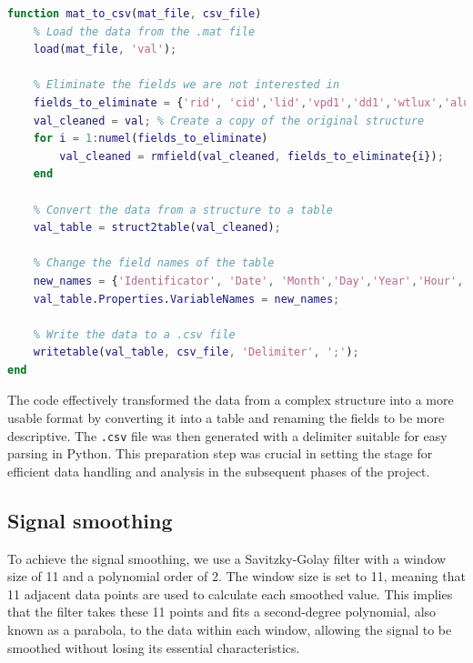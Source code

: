 \begin{lstlisting}[language=Matlab,caption={MATLAB function to convert .mat file to .csv}, label=lst:mat_to_csv]
function mat_to_csv(mat_file, csv_file)
    % Load the data from the .mat file
    load(mat_file, 'val');
    
    % Eliminate the fields we are not interested in
    fields_to_eliminate = {'rid', 'cid','lid','vpd1','dd1','wtlux','alux','ecb1','ecp1','st2', 'p2', 'ec2', 'vwc2', 'ecb2', 'ecp2', 'st3', 'p3', 'ec3', 'vwc3', 'ecb3', 'ecp3','par','dli'};
    val_cleaned = val; % Create a copy of the original structure
    for i = 1:numel(fields_to_eliminate)
        val_cleaned = rmfield(val_cleaned, fields_to_eliminate{i});
    end
    
    % Convert the data from a structure to a table
    val_table = struct2table(val_cleaned);
    
    % Change the field names of the table
    new_names = {'Identificator', 'Date', 'Month','Day','Year','Hour','Minute','Second','Temperature','Relative_humidity', 'Light', 'Soil_temperature', 'Permittivity', 'Electroconductivity', 'Volumetric_water_content', 'Diameter', 'Battery_voltage'};
    val_table.Properties.VariableNames = new_names;
    
    % Write the data to a .csv file
    writetable(val_table, csv_file, 'Delimiter', ';');
end
\end{lstlisting}

The code effectively transformed the data from a complex structure into a more usable format by converting it into a table and renaming the fields to be more descriptive. The \texttt{.csv} file was then generated with a delimiter suitable for easy parsing in Python. This preparation step was crucial in setting the stage for efficient data handling and analysis in the subsequent phases of the project.

\subsection{Signal smoothing}

To achieve the signal smoothing, we use a Savitzky-Golay filter with a window size of 11 and a polynomial order of 2. The window size is set to 11, meaning that 11 adjacent data points are used to calculate each smoothed value. This implies that the filter takes these 11 points and fits a second-degree polynomial, also known as a parabola, to the data within each window, allowing the signal to be smoothed without losing its essential characteristics.


